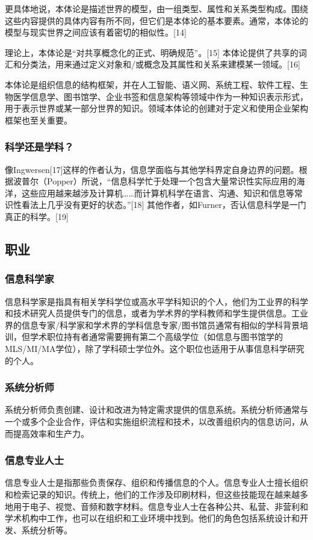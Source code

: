 更具体地说，本体论是描述世界的模型，由一组类型、属性和关系类型构成。围绕这些内容提供的具体内容有所不同，但它们是本体论的基本要素。通常，本体论的模型与现实世界之间应该有着密切的相似性。[14]

理论上，本体论是“对共享概念化的正式、明确规范”。[15] 本体论提供了共享的词汇和分类法，用来通过定义对象和/或概念及其属性和关系来建模某一领域。[16]

本体论是组织信息的结构框架，并在人工智能、语义网、系统工程、软件工程、生物医学信息学、图书馆学、企业书签和信息架构等领域中作为一种知识表示形式，用于表示世界或某一部分世界的知识。领域本体论的创建对于定义和使用企业架构框架也至关重要。
\subsubsection{科学还是学科？}  
像Ingwersen[17]这样的作者认为，信息学面临与其他学科界定自身边界的问题。根据波普尔（Popper）所说，“信息科学忙于处理一个包含大量常识性实际应用的海洋，这些应用越来越涉及计算机……而计算机科学在语言、沟通、知识和信息等常识性看法上几乎没有更好的状态。”[18] 其他作者，如Furner，否认信息科学是一门真正的科学。[19]
\subsection{职业}  
\subsubsection{信息科学家}  
信息科学家是指具有相关学科学位或高水平学科知识的个人，他们为工业界的科学和技术研究人员提供专门的信息，或者为学术界的学科教师和学生提供信息。工业界的信息专家/科学家和学术界的学科信息专家/图书馆员通常有相似的学科背景培训，但学术职位持有者通常需要拥有第二个高级学位（如信息与图书馆学的MLS/MI/MA学位），除了学科硕士学位外。这个职位也适用于从事信息科学研究的个人。
\subsubsection{系统分析师}  
系统分析师负责创建、设计和改进为特定需求提供的信息系统。系统分析师通常与一个或多个企业合作，评估和实施组织流程和技术，以改善组织内的信息访问，从而提高效率和生产力。
\subsubsection{信息专业人士}    
信息专业人士是指那些负责保存、组织和传播信息的个人。信息专业人士擅长组织和检索记录的知识。传统上，他们的工作涉及印刷材料，但这些技能现在越来越多地用于电子、视觉、音频和数字材料。信息专业人士在各种公共、私营、非营利和学术机构中工作，也可以在组织和工业环境中找到。他们的角色包括系统设计和开发、系统分析等。
